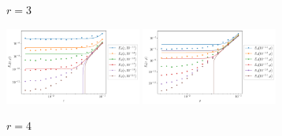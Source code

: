 \begin{figure}
\begin{center}
\begin{subfigure}{\textwidth}
			\caption{\(r = 3\)}
		\end{subfigure}
		\begin{subfigure}{\textwidth}
			\includegraphics[width=0.49\textwidth]{chp04_paper_numerics/figures/sine/str_err_eps_r_4.0_log.pdf}
			\includegraphics[width=0.49\textwidth]{chp04_paper_numerics/figures/sine/str_err_rho_r_4.0_log.pdf}
			\caption{\(r = 4\)}
		\end{subfigure}
		\caption{}
		\label{fig:sine_lines_extra}
	\end{center}
\end{figure}


